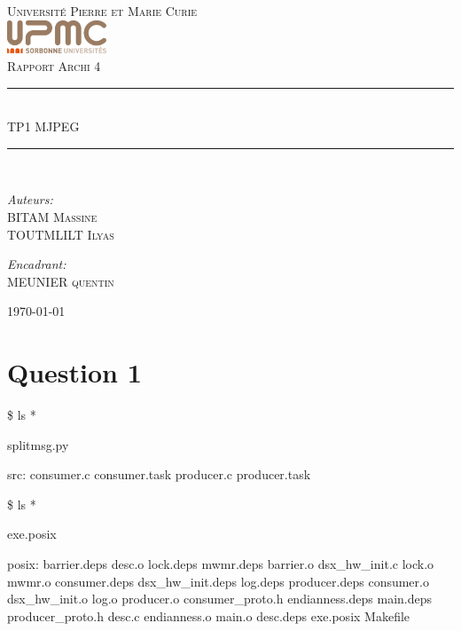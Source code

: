 \documentclass[12pt]{article}
\newcommand{\HRule}{\rule{\linewidth}{0.5mm}}
\begin{document}
\begin{titlepage}
  \begin{center}
    \textsc{\LARGE Université Pierre et Marie Curie}\\[1.5cm]
    \includegraphics[height=1cm]{upmc.png}\\[1.5cm]
    \textsc{\Large Rapport Archi 4 }\\[2cm]
    \HRule \\[1cm]
    \textsc{\huge TP1 MJPEG }\\[0.5cm]
    \HRule \\[1cm]
    \noindent
    \begin{minipage}[t]{0.55\textwidth}
      \begin{flushleft} \large
        \emph{Auteurs:}\\
        BITAM \textsc{Massine}\\
        TOUTMLILT \textsc{Ilyas}
      \end{flushleft}
    \end{minipage}%
    \begin{minipage}[t]{0.47\textwidth}
      \begin{flushright} \large
        \emph{Encadrant:} \\
        MEUNIER \textsc{quentin}
      \end{flushright}
    \end{minipage}
    \vfill
    {\large \today}
  \end{center}
\end{titlepage}

\section*{Question 1}

\$ ls *

splitmsg.py

src:
consumer.c  consumer.task  producer.c  producer.task

\$ ls *

exe.posix

posix:
barrier.deps      desc.o            lock.deps  mwmr.deps
barrier.o         dsx\_hw\_init.c     lock.o     mwmr.o
consumer.deps     dsx\_hw\_init.deps  log.deps   producer.deps
consumer.o        dsx\_hw\_init.o     log.o      producer.o
consumer\_proto.h  endianness.deps   main.deps  producer\_proto.h
desc.c            endianness.o      main.o
desc.deps         exe.posix         Makefile
\end{document}
